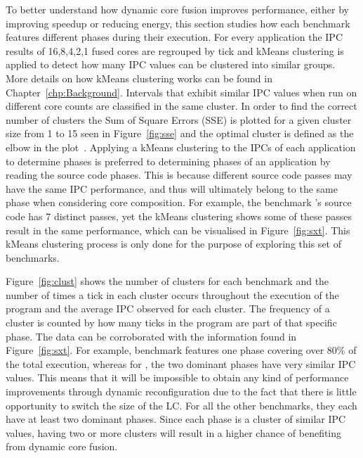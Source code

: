 To better understand how dynamic core fusion improves performance, either by improving speedup or reducing energy, this section studies how each benchmark features different phases during their execution.
For every application the IPC results of 16,8,4,2,1 fused cores are regrouped by tick and kMeans clustering is applied to detect how many IPC values can be clustered into similar groups.
More details on how kMeans clustering works can be found in Chapter~\ref{chp:Background}.
Intervals that exhibit similar IPC values when run on different core counts are classified in the same cluster.
In order to find the correct number of clusters the Sum of Square Errors (SSE) is plotted for a given cluster size from 1 to 15 seen in Figure~\ref{fig:sse} and the optimal cluster is defined as the elbow in the plot~\cite{everitCluster2001}.
Applying a kMeans clustering to the IPCs of each application to determine phases is preferred to determining phases of an application by reading the source code phases.
This is because different source code passes may have the same IPC performance, and thus will ultimately belong to the same phase when considering core composition.
For example, the benchmark 's source code has 7 distinct passes, yet the kMeans clustering shows some of these passes result in the same performance, which can be visualised in Figure~\ref{fig:sxt}.
This kMeans clustering process is only done for the purpose of exploring this set of benchmarks.

Figure~\ref{fig:clust} shows the number of clusters for each benchmark and the number of times a tick in each cluster occurs throughout the execution of the program and the average IPC observed for each cluster.
The frequency of a cluster is counted by how many ticks in the program are part of that specific phase.
The data can be corroborated with the information found in Figure~\ref{fig:sxt}.
For example, benchmark  features one phase covering over 80\% of the total execution, whereas for , the two dominant phases have very similar IPC values.
This means that it will be impossible to obtain any kind of performance improvements through dynamic reconfiguration due to the fact that there is little opportunity to switch the size of the LC.
For all the other benchmarks, they each have at least two dominant phases.
Since each phase is a cluster of similar IPC values, having two or more clusters will result in a higher chance of benefiting from dynamic core fusion.

